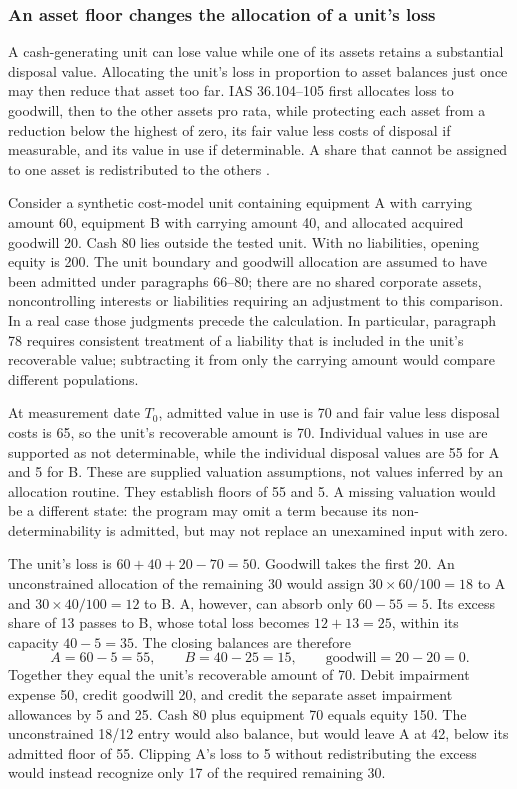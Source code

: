 \subsubsection{An asset floor changes the allocation of a unit's loss}
\label{sec:impairment-floors}

A cash-generating unit can lose value while one of its assets retains a
substantial disposal value. Allocating the unit's loss in proportion to asset
balances just once may then reduce that asset too far. IAS 36.104--105 first
allocates loss to goodwill, then to the other assets pro rata, while protecting
each asset from a reduction below the highest of zero, its fair value less
costs of disposal if measurable, and its value in use if determinable. A share
that cannot be assigned to one asset is redistributed to the others
\citep{eu20231803}.

Consider a synthetic cost-model unit containing equipment A with carrying
amount 60, equipment B with carrying amount 40, and allocated acquired
goodwill 20. Cash 80 lies outside the tested unit. With no liabilities, opening
equity is 200. The unit boundary and goodwill allocation are assumed to have
been admitted under paragraphs 66--80; there are no shared corporate assets,
noncontrolling interests or liabilities requiring an adjustment to this
comparison. In a real case those judgments precede the calculation. In
particular, paragraph 78 requires consistent treatment of a liability that is
included in the unit's recoverable value; subtracting it from only the carrying
amount would compare different populations.

At measurement date $T_0$, admitted value in use is 70 and fair value less
disposal costs is 65, so the unit's recoverable amount is 70. Individual
values in use are supported as not determinable, while the individual disposal
values are 55 for A and 5 for B. These are supplied valuation assumptions,
not values inferred by an allocation routine. They establish floors of 55
and 5. A missing valuation would be a different state: the program may omit
a term because its non-determinability is admitted, but may not replace an
unexamined input with zero.

The unit's loss is $60+40+20-70=50$. Goodwill takes the first 20. An
unconstrained allocation of the remaining 30 would assign
$30\times60/100=18$ to A and $30\times40/100=12$ to B. A, however, can
absorb only $60-55=5$. Its excess share of 13 passes to B, whose total loss
becomes $12+13=25$, within its capacity $40-5=35$. The closing balances are
therefore
\[
  A=60-5=55,\qquad B=40-25=15,\qquad
  \text{goodwill}=20-20=0.
\]
Together they equal the unit's recoverable amount of 70. Debit impairment
expense 50, credit goodwill 20, and credit the separate asset impairment
allowances by 5 and 25. Cash 80 plus equipment 70 equals equity 150. The
unconstrained 18/12 entry would also balance, but would leave A at 42,
below its admitted floor of 55. Clipping A's loss to 5 without redistributing
the excess would instead recognize only 17 of the required remaining 30.

